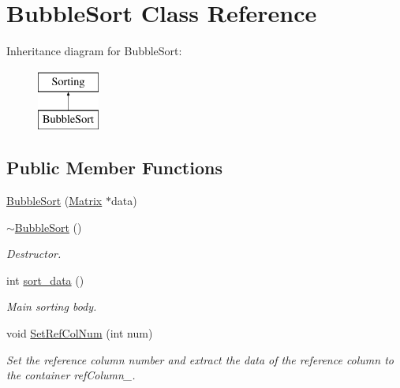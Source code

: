 \hypertarget{classBubbleSort}{
\section{BubbleSort Class Reference}
\label{d9/d2a/classBubbleSort}
}
Inheritance diagram for BubbleSort:\begin{figure}[H]
\begin{center}
\leavevmode
\includegraphics[height=2cm]{d9/d2a/classBubbleSort}
\end{center}
\end{figure}
\subsection*{Public Member Functions}
\begin{DoxyCompactItemize}
\item 
\hyperlink{classBubbleSort_a73599d7344bec5da6fb773c598500a60}{BubbleSort} (\hyperlink{classMatrix}{Matrix} $\ast$data)
\item 
\hypertarget{classBubbleSort_ac04244c2a98e23b093a24ffda60ae48a}{
\hyperlink{classBubbleSort_ac04244c2a98e23b093a24ffda60ae48a}{$\sim$BubbleSort} ()}
\label{d9/d2a/classBubbleSort_ac04244c2a98e23b093a24ffda60ae48a}

\begin{DoxyCompactList}\small\item\em Destructor. \item\end{DoxyCompactList}\item 
int \hyperlink{classBubbleSort_adec94eefc1117e7f302b303f5268c53a}{sort\_\-data} ()
\begin{DoxyCompactList}\small\item\em Main sorting body. \item\end{DoxyCompactList}\item 
\hypertarget{classBubbleSort_a6e78d7424bd49c3d1586d57e7b137756}{
void \hyperlink{classBubbleSort_a6e78d7424bd49c3d1586d57e7b137756}{SetRefColNum} (int num)}
\label{d9/d2a/classBubbleSort_a6e78d7424bd49c3d1586d57e7b137756}

\begin{DoxyCompactList}\small\item\em Set the reference column number and extract the data of the reference column to the container refColumn\_\-. \item\end{DoxyCompactList}\end{DoxyCompactItemize}


